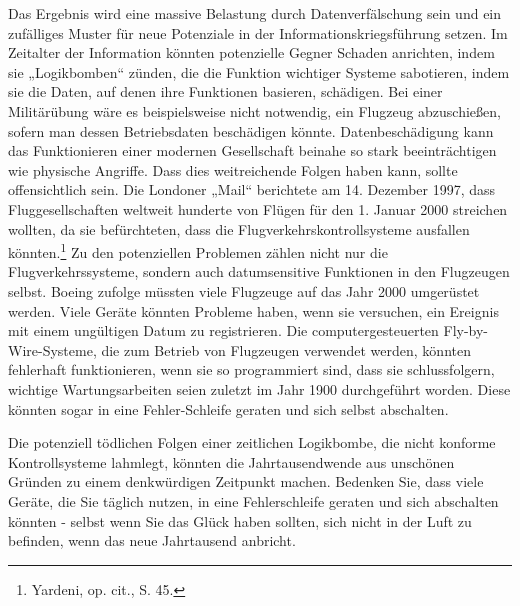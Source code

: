 \documentclass[
  a5paper,
  smalldemyvopaper,10pt,twoside,onecolumn,openright,extrafontsizes,hidelinks]{memoir}
\begin{document}
Das Ergebnis wird eine massive Belastung durch Datenverfälschung sein
und ein zufälliges Muster für neue Potenziale in der
Informationskriegsführung setzen. Im Zeitalter der Information könnten
potenzielle Gegner Schaden anrichten, indem sie „Logikbomben`` zünden,
die die Funktion wichtiger Systeme sabotieren, indem sie die Daten, auf
denen ihre Funktionen basieren, schädigen. Bei einer Militärübung wäre
es beispielsweise nicht notwendig, ein Flugzeug abzuschießen, sofern man
dessen Betriebsdaten beschädigen könnte. Datenbeschädigung kann das
Funktionieren einer modernen Gesellschaft beinahe so stark
beeinträchtigen wie physische Angriffe. Dass dies weitreichende Folgen
haben kann, sollte offensichtlich sein. Die Londoner „Mail`` berichtete
am 14. Dezember 1997, dass Fluggesellschaften weltweit hunderte von
Flügen für den 1. Januar 2000 streichen wollten, da sie befürchteten,
dass die Flugverkehrskontrollsysteme ausfallen könnten.\footnote{Yardeni,
  op. cit., S. 45.} Zu den potenziellen Problemen zählen nicht nur die
Flugverkehrssysteme, sondern auch datumsensitive Funktionen in den
Flugzeugen selbst. Boeing zufolge müssten viele Flugzeuge auf das Jahr
2000 umgerüstet werden. Viele Geräte könnten Probleme haben, wenn sie
versuchen, ein Ereignis mit einem ungültigen Datum zu registrieren. Die
computergesteuerten Fly-by-Wire-Systeme, die zum Betrieb von Flugzeugen
verwendet werden, könnten fehlerhaft funktionieren, wenn sie so
programmiert sind, dass sie schlussfolgern, wichtige Wartungsarbeiten
seien zuletzt im Jahr 1900 durchgeführt worden. Diese könnten sogar in
eine Fehler-Schleife geraten und sich selbst abschalten.

Die potenziell tödlichen Folgen einer zeitlichen Logikbombe, die nicht
konforme Kontrollsysteme lahmlegt, könnten die Jahrtausendwende aus
unschönen Gründen zu einem denkwürdigen Zeitpunkt machen. Bedenken Sie,
dass viele Geräte, die Sie täglich nutzen, in eine Fehlerschleife
geraten und sich abschalten könnten - selbst wenn Sie das Glück haben
sollten, sich nicht in der Luft zu befinden, wenn das neue Jahrtausend
anbricht.
\end{document}

